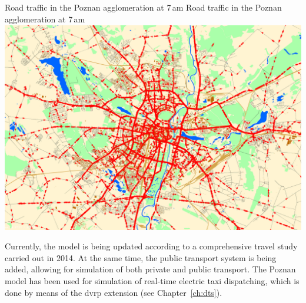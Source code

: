\createfigure%
{Road traffic in the Poznan agglomeration at 7\,am}%
{Road traffic in the Poznan agglomeration at 7\,am}%
{\label{fig:poznan_traffic_simulation}}%
{\includegraphics[width=\textwidth, angle=0]{using/figures/poznan_traffic_simulation}}%
{}%

Currently, the model is being updated according to a comprehensive travel study carried out in 2014. At the same time, the public transport system is being added, allowing for simulation of both private and public transport. The Poznan model has been used for simulation of real-time electric taxi dispatching, which is done by means of the \gls{dvrp} \gls{extension} (see Chapter~\ref{ch:dts}).


